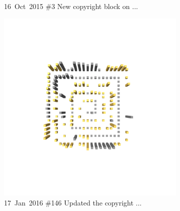 \begin{figure}[ht]
\begin{subfigure}{0.32\textwidth}
        \caption{\mbox{16 Oct 2015}  \hfill  \linebreak  \#3 New copyright block on ...} 
        \label{fig:JetUML_V0S6}
    \end{subfigure}
    \hspace*{\fill}
    \medskip
    \begin{subfigure}{0.32\textwidth}
        \includegraphics[width=\linewidth]{JetUML_V0S7.png}
        \caption{\mbox{17 Jan 2016} \hfill \linebreak  \#146 Updated the copyright ...}
         \label{fig:JetUML_V0S7}
    \end{subfigure}
    \hspace*{\fill}
    \begin{subfigure}{0.32\textwidth}

\end{subfigure}
\end{figure}
